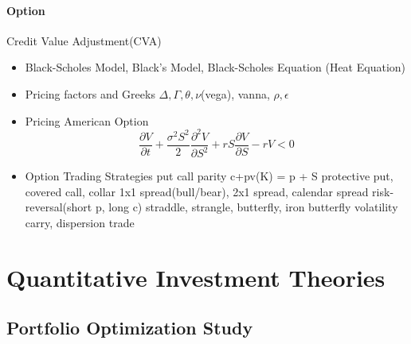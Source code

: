 \documentclass[11pt, openany]{book}              %
\begin{document}
\subsection{Option}

Credit Value Adjustment(CVA)
 \begin{itemize}
    \item Black-Scholes Model, Black's Model, Black-Scholes Equation (Heat Equation)
    \item Pricing factors and Greeks $\Delta,\Gamma, \theta, \nu$(vega), vanna, $\rho,\epsilon$ 
    \item Pricing American Option
    $$\frac{\partial V}{\partial t} + \frac{\sigma^2 S^2}{2} \frac{\partial^2 V}{\partial S^2}+ r S \frac{\partial V}{\partial S} - rV < 0 $$
    \item Option Trading Strategies
     \subitem put call parity c+pv(K) = p + S
     \subitem protective put, covered call, collar
     \subitem 1x1 spread(bull/bear), 2x1 spread, calendar spread
     \subitem risk-reversal(short p, long c)
     \subitem straddle, strangle, butterfly, iron butterfly
     \subitem volatility carry, dispersion trade
\end{itemize}



\part{Quantitative Investment Theories}
\chapter{Portfolio Optimization Study}
\end{document}

